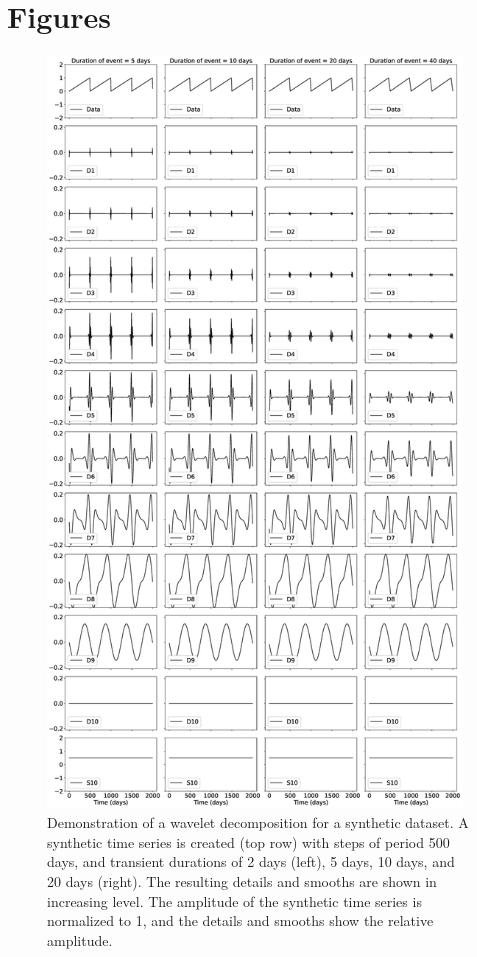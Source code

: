 \documentclass{article}
\begin{document}
\newpage

\section*{Figures}

\begin{figure}
\noindent\includegraphics[width=11cm, trim={0cm 0cm 0cm 0cm},clip]{figures/500_DS.eps}
\caption{Demonstration of a wavelet decomposition for a synthetic dataset. A synthetic time series is created (top row) with steps of period 500 days, and transient durations of 2 days (left), 5 days, 10 days, and 20 days (right). The resulting details and smooths are shown in increasing level. The amplitude of the synthetic time series is normalized to 1, and the details and smooths show the relative amplitude.}
\label{pngfiguresample}
\end{figure}
\end{document}
